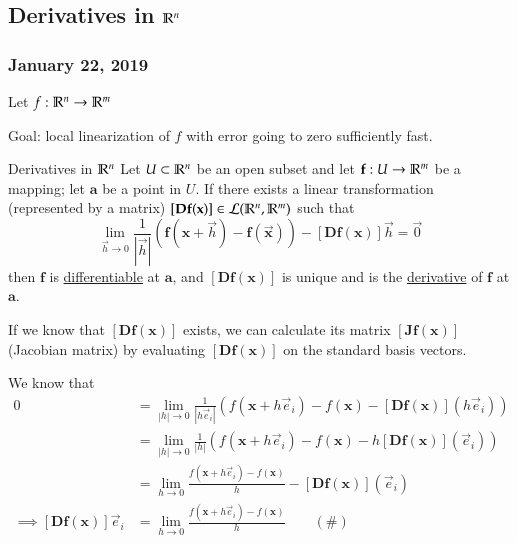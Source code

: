 \subsection{Derivatives in $\mathbb{R}^n$}
\subsubsection*{January 22, 2019}


Let $f : \mathbb{R}^n \rightarrow \mathbb{R}^m$

Goal: local linearization of $f$ with error going to zero sufficiently fast.

\begin{defn}{Derivatives in $\mathbb{R}^n$}
Let $U\subset \mathbb{R}^n$ be an open subset and let $\textbf{f} : U \to \mathbb{R}^m$ be a mapping; let $\bm{a}$ be a point in $U$. If there exists a linear transformation (represented by a matrix) $[\textbf{Df}(\textbf{x})] \in\mathcal{L}(\mathbb{R}^n, \mathbb{R}^m)$ such that
\begin{equation}
	\lim_{\vec{h}\rightarrow 0}\frac{1}{|\vec{h}|}(\bm{f}(\bm{x}+\vec{h})-\bm{f}(\vec{\bm{x}}))-[\bm{Df}(\bm{x})]\vec{h}=\vec{0}
\end{equation}
then $\bm{f}$ is \ul{differentiable} at $\bm{a}$, and $[\bm{Df}(\bm{x})]$ is unique and is the \ul{derivative} of $\bm{f}$ at $\bm{a}$. 
\end{defn}

If we know that $[\bm{Df}(\bm{x})]$ exists, we can calculate its matrix $[\bm{Jf}(\bm{x})]$ (Jacobian matrix) by evaluating $[\bm{Df}(\bm{x})]$ on the standard basis vectors.

We know that
\begin{align*}
0 &= \lim_{|h|\rightarrow 0}\frac{1}{|h\vec{e}_i|}\left( f(\bm{x}+h\vec{e}_i)-f(\bm{x})-[\bm{Df}(\bm{x})](h\vec{e}_i) \right) \\
&= \lim_{|h|\rightarrow 0}\frac{1}{|h|}\left( f(\bm{x}+h\vec{e}_i)-f(\bm{x})-h[\bm{Df}(\bm{x})](\vec{e}_i)\right) \\
&= \lim_{h\rightarrow 0}\frac{f(\bm{x}+h\vec{e}_i)-f(\bm{x})}{h} -[\bm{Df}(\bm{x})](\vec{e}_i) \\
\implies [\bm{Df}(\bm{x})]\vec{e}_i &= \lim_{h\rightarrow 0}\frac{f(\bm{x}+h\vec{e}_i)-f(\bm{x})}{h}\qquad (\#)
\end{align*}



